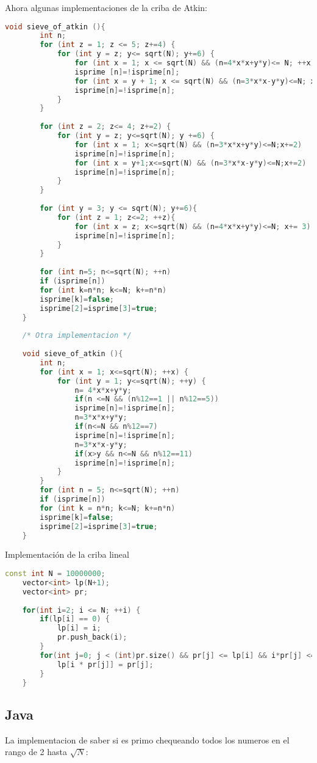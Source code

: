 Ahora algunas implementaciones de la criba de Atkin:
\begin{lstlisting}[language=C++]
	void sieve_of_atkin (){
		int n;
		for (int z = 1; z <= 5; z+=4) {
			for (int y = z; y<= sqrt(N); y+=6) {
				for (int x = 1; x <= sqrt(N) && (n=4*x*x+y*y)<= N; ++x)
				isprime [n]=!isprime[n];
				for (int x = y + 1; x <= sqrt(N) && (n=3*x*x-y*y)<=N; x+=2)
				isprime[n]=!isprime[n];
			}
		}
		
		for (int z = 2; z<= 4; z+=2) {
			for (int y = z; y<=sqrt(N); y +=6) {
				for (int x = 1; x<=sqrt(N) && (n=3*x*x+y*y)<=N;x+=2)
				isprime[n]=!isprime[n];
				for (int x = y+1;x<=sqrt(N) && (n=3*x*x-y*y)<=N;x+=2)
				isprime[n]=!isprime[n];
			}
		}
		
		for (int y = 3; y <= sqrt(N); y+=6){
			for (int z = 1; z<=2; ++z){
				for (int x = z; x<=sqrt(N) && (n=4*x*x+y*y)<=N; x+= 3)
				isprime[n]=!isprime[n];
			}
		}
		
		for (int n=5; n<=sqrt(N); ++n)
		if (isprime[n])
		for (int k=n*n; k<=N; k+=n*n)
		isprime[k]=false;
		isprime[2]=isprime[3]=true;
	}
	
	/* Otra implementacion */
	
	void sieve_of_atkin (){
		int n;
		for (int x = 1; x<=sqrt(N); ++x) {
			for (int y = 1; y<=sqrt(N); ++y) {
				n= 4*x*x+y*y;
				if(n <=N && (n%12==1 || n%12==5))
				isprime[n]=!isprime[n];
				n=3*x*x+y*y;
				if(n<=N && n%12==7)
				isprime[n]=!isprime[n];
				n=3*x*x-y*y;
				if(x>y && n<=N && n%12==11)
				isprime[n]=!isprime[n];
			}
		}
		for (int n = 5; n<=sqrt(N); ++n)
		if (isprime[n])
		for (int k = n*n; k<=N; k+=n*n)
		isprime[k]=false;
		isprime[2]=isprime[3]=true;
	}
\end{lstlisting}

Implementación de la criba lineal
\begin{lstlisting}[language=C++]
	const int N = 10000000;
	vector<int> lp(N+1);
	vector<int> pr;
	
	for(int i=2; i <= N; ++i) {
		if(lp[i] == 0) {
			lp[i] = i;
			pr.push_back(i);
		}
		for(int j=0; j < (int)pr.size() && pr[j] <= lp[i] && i*pr[j] <= N; ++j) {
			lp[i * pr[j]] = pr[j];
		}
	}
\end{lstlisting}

\subsection{Java}
La implementacion de saber si es primo chequeando todos los numeros en el rango de 2 hasta $\sqrt{N}$:

